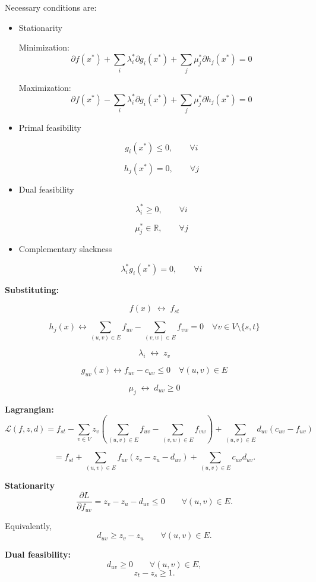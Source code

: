 \documentclass[12pt, openany]{article}
\begin{document}
Necessary conditions are:
\begin{itemize}
\item Stationarity

Minimization:
\[
\partial f(x^*)+\sum_i \lambda_i^*\partial g_i(x^*)+\sum_j \mu_j^*\partial h_j(x^*)=0
\]

Maximization:
\[
\partial f(x^*)-\sum_i \lambda_i^*\partial g_i(x^*)+\sum_j \mu_j^*\partial h_j(x^*)=0
\]

\item Primal feasibility

\[
g_i(x^*)\le 0,\qquad \forall i
\]

\[
h_j(x^*)=0,\qquad \forall j
\]

\item Dual feasibility

\[
\lambda_i^*\ge 0,\qquad \forall i
\]

\[
\mu_j^* \in \mathbb{R},\qquad \forall j
\]

\item Complementary slackness

\[
\lambda_i^* g_i(x^*)=0,\qquad \forall i
\]
\end{itemize}

\textbf{Substituting:}

\[
f(x) \;\longleftrightarrow\; f_{st}
\]

\[
h_j(x)
\longleftrightarrow
\sum_{(u,v)\in E} f_{uv}
-
\sum_{(v,w)\in E} f_{vw}
=0
\quad \forall v\in V\setminus\{s,t\}
\]

\[
\lambda_i \;\longleftrightarrow\; z_v
\]

\[
g_{uv}(x)
\longleftrightarrow
f_{uv}-c_{uv} \le 0
\quad \forall (u,v)\in E
\]

\[
\mu_{j} \;\longleftrightarrow\; d_{uv} \ge 0
\]

\textbf{Lagrangian:}
\[
\mathcal L(f,z,d) = f_{st}
-
\sum_{v\in V} z_v
\left(
\sum_{(u,v)\in E} f_{uv}
-
\sum_{(v,w)\in E} f_{vw}
\right)
+
\sum_{(u,v)\in E} d_{uv}(c_{uv}-f_{uv})
\]

\[ =
f_{st}
+
\sum_{(u,v)\in E}
f_{uv}(z_v - z_u - d_{uv})
+
\sum_{(u,v)\in E} c_{uv} d_{uv}.
\]

\textbf{Stationarity}
\[
\frac{\partial L}{\partial f_{uv}}
=
z_v-z_u-d_{uv}
\le 0
\qquad \forall (u,v)\in E.
\]

Equivalently,
\[
d_{uv}\ge z_v-z_u
\qquad \forall (u,v)\in E.
\]

\textbf{Dual feasibility:}
\[
d_{uv}\ge 0
\qquad \forall (u,v)\in E,
\]
\[
z_t-z_s\ge 1.
\]
\end{document}
